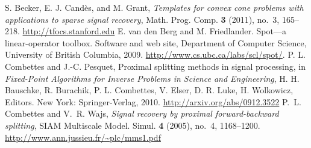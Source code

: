 \documentclass{article}
\newcommand{\<}{\langle}
\renewcommand{\>}{\rangle}
\begin{document}
\begin{thebibliography}{2}
     S. Becker, E. J. Cand\`es, and M. Grant, \emph{Templates for convex cone problems with applications to sparse signal recovery}, Math. Prog. Comp. \textbf{3} (2011), no.~3, 165--218.
    \url{http://tfocs.stanford.edu}
 E. van den Berg and M. Friedlander. Spot---a linear-operator
toolbox. Software and web site, Department of Computer Science, 
University of British Columbia, 2009. \url{http://www.cs.ubc.ca/labs/scl/spot/}.
P. L. Combettes and J.-C. Pesquet, Proximal splitting methods in signal processing, in \emph{Fixed-Point Algorithms for Inverse Problems in Science and Engineering}, H. H. Bauschke, R. Burachik, P. L. Combettes, V. Elser, D. R. Luke, H. Wolkowicz, Editors. New York: Springer-Verlag, 2010.
\url{http://arxiv.org/abs/0912.3522}
P.~L. Combettes and V.~R. Wajs, \emph{Signal recovery by proximal
  forward-backward splitting}, SIAM Multiscale Model. Simul. \textbf{4} (2005),
  no.~4, 1168--1200. \url{http://www.ann.jussieu.fr/~plc/mms1.pdf}
\end{thebibliography}
\end{document}
